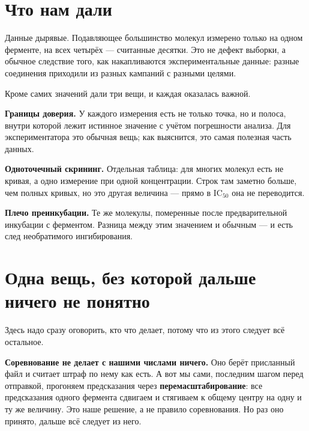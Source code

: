 \documentclass[11pt,a4paper]{article}
\begin{document}
\section{Что нам дали}

Данные дырявые. Подавляющее большинство молекул измерено только на одном ферменте, на всех
четырёх --- считанные десятки. Это не дефект выборки, а обычное следствие того, как
накапливаются экспериментальные данные: разные соединения приходили из разных кампаний с
разными целями.

Кроме самих значений дали три вещи, и каждая оказалась важной.

\textbf{Границы доверия.} У каждого измерения есть не только точка, но и полоса, внутри
которой лежит истинное значение с учётом погрешности анализа. Для экспериментатора это
обычная вещь; как выяснится, это самая полезная часть данных.

\textbf{Одноточечный скрининг.} Отдельная таблица: для многих молекул есть не кривая, а одно
измерение при одной концентрации. Строк там заметно больше, чем полных кривых, но это другая
величина --- прямо в \textrm{IC}$_{50}$ она не переводится.

\textbf{Плечо преинкубации.} Те же молекулы, померенные после предварительной инкубации с
ферментом. Разница между этим значением и обычным --- и есть след необратимого ингибирования.

\section{Одна вещь, без которой дальше ничего не понятно}

Здесь надо сразу оговорить, кто что делает, потому что из этого следует всё остальное.

\textbf{Соревнование не делает с нашими числами ничего.} Оно берёт присланный файл и считает
штраф по нему как есть. А вот мы сами, последним шагом перед отправкой, прогоняем предсказания
через \textbf{перемасштабирование}: все предсказания одного фермента сдвигаем и стягиваем к
общему центру на одну и ту же величину. Это наше решение, а не правило соревнования. Но раз
оно принято, дальше всё следует из него.

\begin{center}\end{center}
\end{document}
